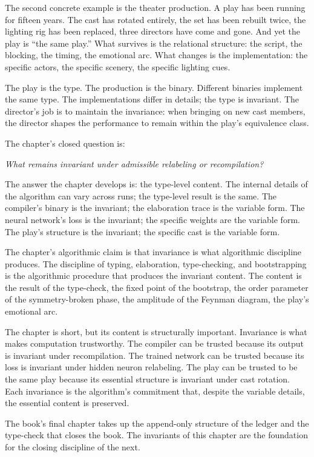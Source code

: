 \begin{chapteressay}
The second concrete example is the theater production. A play has
been running for fifteen years. The cast has rotated entirely,
the set has been rebuilt twice, the lighting rig has been
replaced, three directors have come and gone. And yet the play is
``the same play.'' What survives is the relational structure: the
script, the blocking, the timing, the emotional arc. What changes
is the implementation: the specific actors, the specific
scenery, the specific lighting cues.

The play is the type. The production is the binary. Different
binaries implement the same type. The implementations differ in
details; the type is invariant. The director's job is to maintain
the invariance: when bringing on new cast members, the director
shapes the performance to remain within the play's equivalence
class.

The chapter's closed question is:

\begin{center}
\emph{What remains invariant under admissible relabeling or
recompilation?}
\end{center}

The answer the chapter develops is: the type-level content. The
internal details of the algorithm can vary across runs; the
type-level result is the same. The compiler's binary is the
invariant; the elaboration trace is the variable form. The
neural network's loss is the invariant; the specific weights are
the variable form. The play's structure is the invariant; the
specific cast is the variable form.

The chapter's algorithmic claim is that invariance is what
algorithmic discipline produces. The discipline of typing,
elaboration, type-checking, and bootstrapping is the
algorithmic procedure that produces the invariant content. The
content is the result of the type-check, the fixed point of the
bootstrap, the order parameter of the symmetry-broken phase, the
amplitude of the Feynman diagram, the play's emotional arc.

The chapter is short, but its content is structurally important.
Invariance is what makes computation trustworthy. The compiler
can be trusted because its output is invariant under
recompilation. The trained network can be trusted because its
loss is invariant under hidden neuron relabeling. The play can
be trusted to be the same play because its essential structure
is invariant under cast rotation. Each invariance is the
algorithm's commitment that, despite the variable details, the
essential content is preserved.

The book's final chapter takes up the append-only structure of
the ledger and the type-check that closes the book. The
invariants of this chapter are the foundation for the closing
discipline of the next.

\end{chapteressay}

